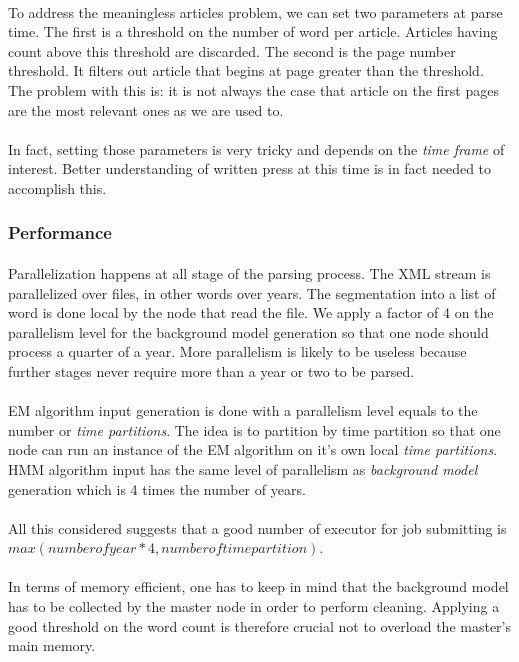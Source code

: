 \paragraph{}
To address the meaningless articles problem, we can set two parameters at parse time. The first is a threshold on the number of word per article. Articles having count above this threshold are discarded. The second is the page number threshold. It filters out article that begins at page greater than the threshold. The problem with this is: it is not always the case that article on the first pages are the most relevant ones as we are used to.

\paragraph{}
In fact, setting those parameters is very tricky and depends on the \emph{time frame} of interest. Better understanding of written press at this time is in fact needed to accomplish this.

\subsubsection*{Performance}
\paragraph{}
Parallelization happens at all stage of the parsing process. The XML stream is parallelized over files, in other words over years. The segmentation into a list of word is done local by the node that read the file. We apply a factor of 4 on the parallelism level for the background model generation so that one node should process a quarter of a year. More parallelism is likely to be useless because further stages never require more than a year or two to be parsed.

\paragraph{}
EM algorithm input generation is done with a parallelism level equals to the number or \emph{time partitions}. The idea is to partition by time partition so that one node can run an instance of the EM algorithm on it's own local  \emph{time partitions}. HMM algorithm input has the same level of parallelism as \emph{background model} generation which is 4 times the number of years. 

\paragraph{}
All this considered suggests that a good number of executor for job submitting is $max(number of year*4, number of time partition)$.

\paragraph{}
In terms of memory efficient, one has to keep in mind that the background model has to be collected by the master node in order to perform cleaning. Applying a good threshold on the word count is therefore crucial not to overload the master's main memory.



